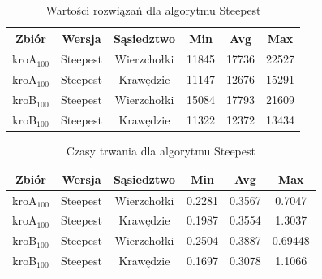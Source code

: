 \documentclass{article}
\begin{document}
\begin{table}[h!]
\centering
\begin{tabular}{ |c|c|c|c|c|c| } 
 \hline
 Zbiór & Wersja & Sąsiedztwo & Min & Avg & Max \\ 
  \hline
 kroA$_{100}$ & Steepest & Wierzchołki & 11845 & 17736 & 22527 \\ 
  \hline
 kroA$_{100}$ & Steepest & Krawędzie & 11147 & 12676 & 15291 \\ 
 \hline
 kroB$_{100}$ & Steepest & Wierzchołki & 15084 & 17793 & 21609 \\ 
 \hline
 kroB$_{100}$ & Steepest & Krawędzie & 11322 & 12372 & 13434 \\ 
 \hline
\end{tabular}
\caption{Wartości rozwiązań dla algorytmu Steepest}
\end{table}

\begin{table}[h!]
\centering
\begin{tabular}{ |c|c|c|c|c|c| } 
 \hline
 Zbiór & Wersja & Sąsiedztwo & Min & Avg & Max \\ 
 \hline
 kroA$_{100}$ & Steepest & Wierzchołki & 0.2281 & 0.3567 & 0.7047 \\ 
  \hline
 kroA$_{100}$ & Steepest & Krawędzie & 0.1987 & 0.3554 & 1.3037 \\ 
 \hline
 kroB$_{100}$ & Steepest & Wierzchołki & 0.2504 & 0.3887 & 0.69448 \\ 
 \hline
 kroB$_{100}$ & Steepest & Krawędzie & 0.1697 & 0.3078 & 1.1066 \\ 
 \hline
\end{tabular}
\caption{Czasy trwania dla algorytmu Steepest}
\end{table}
\end{document}
